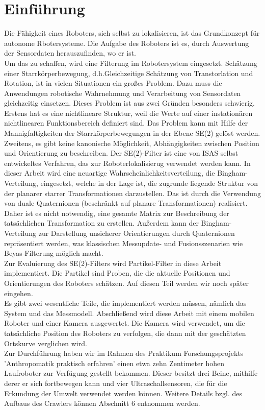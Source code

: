 \section{Einführung}
Die Fähigkeit eines Roboters, sich selbst zu lokalisieren, ist das Grundkonzept für autonome Rbotersysteme. Die Aufgabe des Roboters ist es, durch Auswertung der Sensordaten herauszufinden, wo er ist.
\\Um das zu schaffen, wird eine Filterung im Robotersystem eingesetzt. Schätzung einer Starrkörperbewegung, d.h.Gleichzeitige Schätzung
von Transtorlation und Rotation, ist in vielen Situationen ein großes Problem.
Dazu muss die Anwendungen robotische Wahrnehmung und Verarbeitung von Sensordaten gleichzeitig einsetzen. Dieses Problem ist aus zwei Gründen besonders schwierig.
\\Erstens hat es eine nichtlineare Struktur, weil die Werte 
auf einer instationären nichtlinearen Funktionsbereich definiert sind. Das Problem kann mit Hilfe der Mannigfaltigkeiten der Starrkörperbewegungen in der Ebene SE(2) gelöst werden. Zweitens, es gibt keine kanonische Möglichkeit, Abhängigkeiten zwischen Position und Orientierung zu beschreiben. Der SE(2)-Filter ist eine von ISAS selbst entwickeltes Verfahren, das zur Roboterlokalisierug verwendet werden kann. In dieser Arbeit wird eine neuartige Wahrscheinlichkeitsverteilung, die Bingham-Verteilung, eingesetzt, welche in der Lage ist, die zugrunde liegende Struktur von der planarer starrer Transformationen darzustellen. Das ist durch die Verwendung von duale Quaternionen (beschränkt auf planare Transformationen) realisiert. Daher ist es nicht notwendig, eine gesamte Matrix zur Beschreibung der tatsächlichen Transformation zu erstellen. Außerdem kann der Bingham-Verteilung zur Darstellung unsicherer Orientierungen durch Quaternionen repräsentiert werden, was klassischen Messupdate- und Fusionsszenarien wie Beyas-Filterung möglich macht.
\\Zur Evaluierung des SE(2)-Filters wird Partikel-Filter in diese Arbeit implementiert. Die Partikel sind Proben, die die aktuelle Positionen und Orientierungen des Roboters schätzen. Auf diesen Teil werden wir noch später eingehen.
\\Es gibt zwei wesentliche Teile, die implementiert werden müssen, nämlich das System und das Messmodell. 
Abschließend wird diese Arbeit mit einem mobilen Roboter und einer Kamera ausgewertet. Die Kamera wird verwendet, um die tatsächliche Position des Roboters zu verfolgen, die dann mit der geschätzten Ortskurve verglichen wird.
\\Zur Durchführung haben wir im Rahmen des Praktikum Forschungsprojekts 'Anthropomatik praktisch erfahren' einen etwa zehn Zentimeter hohen Laufroboter zur Verfügung gestellt bekommen. Dieser besitzt drei Beine, mithilfe derer er sich fortbewegen kann und vier Ultraschallsensoren, die für die Erkundung der Umwelt verwendet werden können. Weitere Details bzgl. des Aufbaus des Crawlers können Abschnitt 6 entnommen werden.

